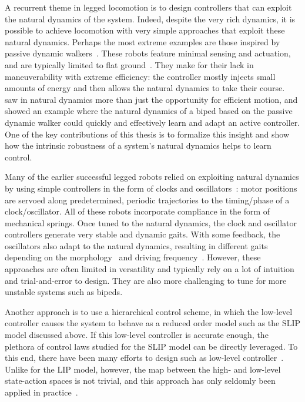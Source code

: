 A recurrent theme in legged locomotion is to design controllers that can exploit the natural dynamics of the system. Indeed, despite the very rich dynamics, it is possible to achieve locomotion with very simple approaches that exploit these natural dynamics.
Perhaps the most extreme examples are those inspired by passive dynamic walkers~\cite{mcgeer1990passive}. These robots feature minimal sensing and actuation, and are typically limited to flat ground~\cite{bhounsule2012design,wisse2006design}. They make for their lack in maneuverability with extreme efficiency: the controller mostly injects small amounts of energy and then allows the natural dynamics to take their course.~\textcite{tedrake2005learning} saw in natural dynamics more than just the opportunity for efficient motion, and showed an example where the natural dynamics of a biped based on the passive dynamic walker could quickly and effectively learn and adapt an active controller. One of the key contributions of this thesis is to formalize this insight and show how the intrinsic robustness of a system's natural dynamics helps to learn control. \par
Many of the earlier successful legged robots relied on exploiting natural dynamics by using simple controllers in the form of clocks and oscillators~\cite{sprowitz2013towards,buchli2006resonance,altendorfer2001rhex,owaki2013simple}: motor positions are servoed along predetermined, periodic trajectories to the timing/phase of a clock/oscillator. All of these robots incorporate compliance in the form of mechanical springs. Once tuned to the natural dynamics, the clock and oscillator controllers generate very stable and dynamic gaits. With some feedback, the oscillators also adapt to the natural dynamics, resulting in different gaits depending on the morphology~\cite{owaki2013simple} and driving frequency~\cite{owaki2017quadruped}. %
However, these approaches are often limited in versatility and typically rely on a lot of intuition and trial-and-error to design. They are also more challenging to tune for more unstable systems such as bipeds. \par
Another approach is to use a hierarchical control scheme, in which the low-level controller causes the system to behave as a reduced order model such as the SLIP model discussed above.
If this low-level controller is accurate enough, the plethora of control laws studied for the SLIP model can be directly leveraged. To this end, there have been many efforts to design such as low-level controller~\cite{hutter2010slip,poulakakis2009spring,wensing2013high}. Unlike for the LIP model, however, the map between the high- and low-level state-action spaces is not trivial, and this approach has only seldomly been applied in practice~\cite{martin2017experimental}.
